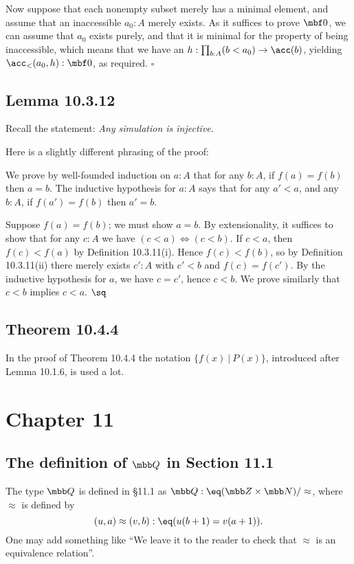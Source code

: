 \documentclass[12pt]{article}
\begin{document}
Now suppose that each nonempty subset merely has a minimal element, and assume that an inaccessible $a_0:A$ merely exists. As it suffices to prove $\mbf0$, we can assume that $a_0$ exists purely, and that it is minimal for the property of being inaccessible, which means that we have an $h:\prod_{b:A}(b<a_0)\to\acc(b)$, yielding $\acc_<(a_0,h):\mbf0$, as required. $\square$


\subsection{Lemma 10.3.12}

Recall the statement: \emph{Any simulation is injective}.

Here is a slightly different phrasing of the proof:

We prove by well-founded induction on $a:A$ that for any $b:A$, if $f(a)=f(b)$ then $a=b$. The inductive hypothesis for $a:A$ says that for any $a'<a$, and any $b:A$, if $f(a')=f(b)$ then $a'=b$.

Suppose $f(a)=f(b)$; we must show $a=b$. By extensionality, it suffices to show that for any $c:A$ we have $(c<a)\Leftrightarrow(c<b)$. If $c<a$, then $f(c)<f(a)$ by Definition 10.3.11(i). Hence $f(c)<f(b)$, so by Definition 10.3.11(ii) there merely exists $c':A$ with $c'<b$ and $f(c)=f(c')$. By the inductive hypothesis for $a$, we have $c=c'$, hence $c<b$. We prove similarly that $c<b$ implies $c<a$. $\sq$


\subsection{Theorem 10.4.4}

In the proof of Theorem 10.4.4 the notation $\{f(x)\ \vert\ P(x)\}$, introduced after Lemma 10.1.6, is used a lot.


\section{Chapter 11}

\subsection[The definition of Q in Section 11.1]{The definition of $\mbb Q$ in Section 11.1}

The type $\mbb Q$ is defined in \S11.1 as $\mbb Q:\eq(\mbb Z\times\mbb N)/\approx$, where $\approx$ is defined by 
$$
(u,a)\approx(v,b):\eq(u(b+1)=v(a+1)).
$$ 
One may add something like ``We leave it to the reader to check that $\approx$ is an equivalence relation''.
\end{document}
